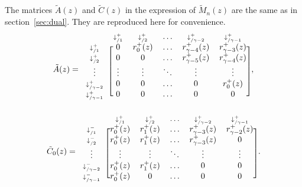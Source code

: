 \documentclass{article}
\begin{document}
The matrices $\tilde{A}(z)$ and $\tilde{C}(z)$ in the expression of
$\tilde{M}_n(z)$ are the same as in section~\ref{sec:dual}. They are
reproduced here for convenience.
\begin{equation*}
\tilde{A}(z) = 
\begin{blockarray}{cccccc}
   & \scriptstyle{\downarrow_{/1}^+} & \scriptstyle{\downarrow_{/2}^+} &
    \ldots & \scriptstyle{\downarrow_{/\gamma-2}^+} &
    \scriptstyle{\downarrow_{/\gamma-1}^+} \\
\begin{block}{c[ccccc]}
\scriptstyle{\downarrow_{/1}^+} & 0 & r_0^+(z) & \ldots &
    r_{\gamma-4}^+(z) & r_{\gamma-3}^+(z) \\
\scriptstyle{\downarrow_{/2}^+} & 0 & 0 & \ldots &
    r_{\gamma-5}^+(z) & r_{\gamma-4}^+(z) \\
\vdots & \vdots & \vdots & \ddots & \vdots & \vdots \\
\scriptstyle{\downarrow_{/\gamma-2}^+} & 0 & 0 & \ldots & 0 & r_0^+(z) \\
\scriptstyle{\downarrow_{/\gamma-1}^+} & 0 & 0 & \ldots & 0 & 0 \\
\end{block}
\end{blockarray},
\end{equation*}
\begin{equation*}
\tilde{C}_0(z) = 
\begin{blockarray}{cccccc}
   & \scriptstyle{\downarrow_{/1}^+} & \scriptstyle{\downarrow_{/2}^+} &
    \ldots & \scriptstyle{\downarrow_{/\gamma-2}^+} &
    \scriptstyle{\downarrow_{/\gamma-1}^+} \\
\begin{block}{c[ccccc]}
\scriptstyle{\downarrow_{/1}^-} & r_0^+(z) & r_1^+(z) & \ldots &
    r_{\gamma-3}^+(z) & r_{\gamma-2}^+(z) \\
\scriptstyle{\downarrow_{/2}^-} & r_0^+(z) & r_1^+(z) & \ldots &
    r_{\gamma-3}^+(z) & 0 \\
\vdots & \vdots & \vdots & \ddots & \vdots & \vdots \\
\scriptstyle{\downarrow_{/\gamma-2}^-} & r_0^+(z) & r_1^+(z) & \ldots &
    0 & 0 \\
\scriptstyle{\downarrow_{/\gamma-1}^-} & r_0^+(z) & 0 & \ldots & 0 & 0 \\
\end{block}
\end{blockarray}.
\end{equation*}
\end{document}
